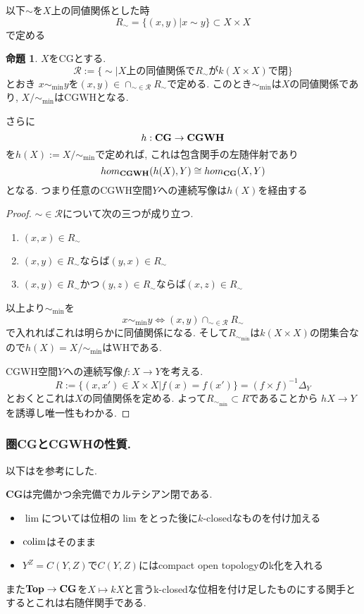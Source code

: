 \documentclass[dvipdfmx,a4paper,11pt]{report}
\newcommand{\colim}{{\rm colim}}
\theoremstyle{definition}
\newtheorem{prop}[thm]{命題}
\begin{document}
以下$\sim$を$X$上の同値関係とした時
$$
R_{\sim}= \{ (x,y)| x \sim y\} \subset X \times X
$$
で定める
 \begin{tcolorbox}
 [colback = white, colframe = green!35!black, fonttitle = \bfseries,breakable = true]
\begin{prop}\cite[Prop2.22]{Str}
$X$をCGとする.
$$
\mathcal{R}:=\{\sim | \text{$X$上の同値関係で$R_{\sim}$が$k(X \times X)$で閉} \}
$$
とおき
$x \sim_{\min} y$を$(x,y) \in \cap_{\sim \in \mathcal{R}} R_{\sim}$で定める.
このとき$\sim_{\min}$は$X$の同値関係であり, $X/\sim_{\min}$はCGWHとなる.

さらに
$$
h : {\bf CG } \to {\bf CGWH}
$$
を$h(X) := X/\sim_{\min}$で定めれば, これは包含関手の左随伴射であり
$$
hom_{{\bf CGWH}}(h(X), Y) \cong hom_{{\bf CG}}(X, Y)
$$
となる. 
つまり任意のCGWH空間$Y$への連続写像は$h(X)$を経由する

\end{prop}
\end{tcolorbox}

\begin{proof}

$\sim \in \mathcal{R}$について次の三つが成り立つ.
\begin{enumerate}
\item $(x,x) \in R_{\sim}$
\item $(x,y)\in R_{\sim}$ならば$(y,x) \in R_{\sim}$
\item $(x,y) \in R_{\sim}$かつ$(y,z) \in R_{\sim}$ならば$(x,z) \in R_{\sim}$
\end{enumerate}
以上より$\sim_{\min}$を
$$
x \sim_{\min} y
\Leftrightarrow
(x,y) \cap_{\sim \in \mathcal{R}} R_{\sim}
$$
で入れればこれは明らかに同値関係になる.
そして$R_{\sim_{\min}}$は$k(X \times X)$の閉集合なので$h(X)=X/\sim_{\min}$はWHである.

CGWH空間$Y$への連続写像$f : X \to Y$を考える.
$$
R:= \{ (x, x') \in X \times X | f(x) = f(x')\}=(f \times f)^{-1}\Delta_{Y}
$$
とおくとこれは$X$の同値関係を定める.
よって$R_{\sim_{\min}} \subset R$であることから
$hX \to Y$を誘導し唯一性もわかる.  
\end{proof}



\subsubsection{圏{\bf CG}と{\bf CGWH}の性質.}
以下は\cite{Fra}を参考にした. 

\begin{tcolorbox}
 [colback = white, colframe = green!35!black, fonttitle = \bfseries,breakable = true]
 {\bf CG}は完備かつ余完備でカルテシアン閉である.
 \begin{itemize}
 \item $\lim$については位相の$\lim$をとった後に$k$-closedなものを付け加える
 \item $\colim$はそのまま
 \item $Y^{Z} = C(Y,Z)$で$C(Y,Z)$にはcompact open topologyのk化を入れる
 \end{itemize}
 また$ {\bf Top}\to { \bf CG }$を$X \mapsto kX$と言うk-closedな位相を付け足したものにする関手とするとこれは右随伴関手である. 
\end{tcolorbox}
\end{document}

